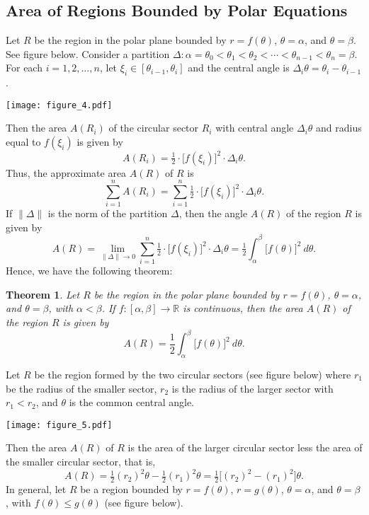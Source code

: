 \documentclass[12pt,twoside]{article}
\newtheorem{theorem}{\bf Theorem}[section]
\begin{document}
\subsection{Area of Regions Bounded by Polar Equations}

Let $R$ be the region in the polar plane bounded by $r=f(\theta)$, $\theta=\alpha$, and $\theta=\beta$. See figure below. Consider a partition $\Delta: \alpha=\theta_0<\theta_1<\theta_2<\cdots<\theta_{n-1}<\theta_n=\beta$. For each $i=1,2,\ldots,n$, let $\xi_i\in [\theta_{i-1},\theta_{i}]$ and the central angle is $\Delta_i\theta=\theta_{i}-\theta_{i-1}$.

\begin{center}
\texttt{[image: figure\_4.pdf]}
\end{center}

Then the area $A(R_i)$ of the circular sector $R_i$ with central angle $\Delta_i\theta$ and radius equal to $f(\xi_i)$ is given by
$$A(R_i)=\tfrac{1}{2}\cdot\Big[f(\xi_i)\Big]^2\cdot\Delta_i\theta.$$
Thus, the approximate area $A(R)$ of $R$ is
$$\sum_{i=1}^{n}A(R_i)=\sum_{i=1}^{n}\tfrac{1}{2}\cdot\Big[f(\xi_i)\Big]^2\cdot\Delta_i\theta.$$
If $\|\Delta\|$ is the norm of the partition $\Delta$, then the angle $A(R)$ of the region $R$ is given by
$$A(R)=\lim_{\|\Delta\|\to0}\sum_{i=1}^{n}\tfrac{1}{2}\cdot\Big[f(\xi_i)\Big]^2\cdot\Delta_i\theta=\tfrac{1}{2}\int_{\alpha}^{\beta}\Big[f(\theta)\Big]^2\ d\theta.$$
Hence, we have the following theorem:

\begin{theorem}
Let $R$ be the region in the polar plane bounded 
by $r=f(\theta)$, $\theta=\alpha$, and $\theta=\beta$, 
with $\alpha<\beta$. If $f:[\alpha,\beta]\to\mathbb{R}$ 
is continuous, then the area $A(R)$ of the region $R$
is given by 
$$A(R)=\frac{1}{2}\int_{\alpha}^{\beta}\Big[f(\theta)\Big]^2\ d\theta.$$
\end{theorem}

Let $R$ be the region formed by the two circular sectors (see figure below) where $r_1$ be the radius of the smaller sector, $r_2$ is the radius of the larger sector with $r_1<r_2$, and $\theta$ is the common central angle.

\begin{center}
\texttt{[image: figure\_5.pdf]}
\end{center}

Then the area $A(R)$ of $R$ is the area of the larger circular sector less the area of the smaller circular sector, that is,
$$A(R)=\tfrac{1}{2}(r_2)^2\theta-\tfrac{1}{2}(r_1)^2\theta=\tfrac{1}{2}\Big[(r_2)^2-(r_1)^2\Big]\theta.$$
In general, let $R$ be a region bounded by $r=f(\theta)$, $r=g(\theta)$, $\theta=\alpha$, and $\theta=\beta$, with $f(\theta)\leq g(\theta)$ (see figure below). 
\end{document}
